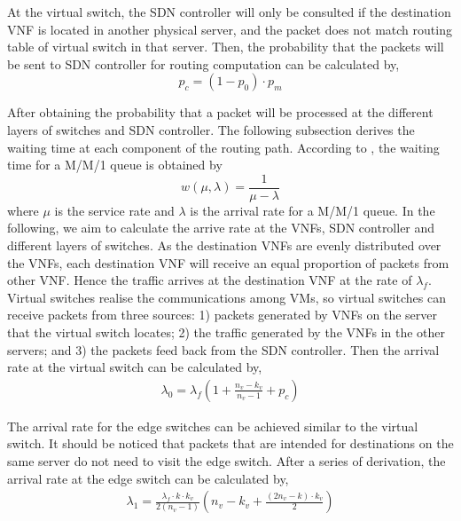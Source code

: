 At the virtual switch, the SDN controller will only be consulted if the destination VNF is located in another physical server, and the packet does not match routing table of virtual switch in that server. Then, the probability that the packets will be sent to SDN controller for routing computation can be calculated by, 
\begin{equation}
\label{eq:p_sdn}
p_{c} = (1 - p_{0}) \cdot p_{m}
\end{equation}

After obtaining the probability that a packet will be processed at the different layers of switches and SDN controller. The following subsection derives the waiting time at each component of the routing path. According to \cite{Kleinrock75}, the waiting time for a M/M/1 queue is obtained by 
\begin{equation}
\label{eq:p_latency}
w(\mu, \lambda) = \frac{1}{\mu - \lambda}
\end{equation}
where $\mu$ is the service rate and $\lambda$ is the arrival rate for a M/M/1 queue.  In the following, we aim to calculate the arrive rate at the VNFs, SDN controller and different layers of switches. As the destination VNFs are evenly distributed over the VNFs, each destination VNF will receive an equal proportion of packets from other VNF. Hence the traffic arrives at the destination VNF at the rate of $\lambda_f$. Virtual switches realise the communications among VMs, so virtual switches can receive packets from three sources: 1) packets generated by VNFs on the server that the virtual switch locates; 2) the traffic generated by the VNFs in the other servers; and 3) the packets feed back from the SDN controller. Then the arrival rate at the virtual switch can be calculated by,
\begin{equation}
\label{eq:arr_srv}
\begin{split}
\lambda _{ 0 }={ \lambda  }_{ f }(1+\frac { n_v-k_{ v } }{ n_v-1 } +p_{ c })
\end{split}
\end{equation}

The arrival rate for the edge switches can be achieved similar to the virtual switch. It should be noticed that packets that are intended for destinations on the same server do not need to visit the edge switch. After a series of derivation, the arrival rate at the edge switch can be calculated by,
\begin{equation}
\label{eq:arr_edge}
\begin{split}
\lambda _{1}=\frac { { \lambda  }_{ f }\cdot k\cdot k_{ v } }{ 2(n_v-1) } (n_v-k_{ v }+\frac { (2n_v-k)\cdot k_{ v } }{ 2 } )
\end{split}
\end{equation}

